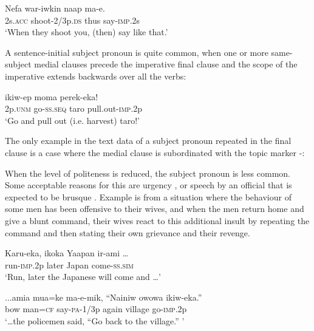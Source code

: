 \ea%
\label{ex:3:x1775}
\gll Nefa war-iwkin naap ma-e. \\
2s.\textsc{acc} shoot-2/3p.\textsc{ds} thus say-\textsc{imp}.2s\\
\glt`When they shoot you, (then) say like that.'
\z

A sentence-initial subject pronoun is quite common, when one or more same-subject medial clauses precede the imperative final clause and the scope of the imperative extends backwards over all the verbs:

\ea%
\label{ex:3:x628}
\gll {} ikiw-ep moma perek-eka! \\
2p.\textsc{unm} go-\textsc{ss}.\textsc{seq} taro pull.out-\textsc{imp}.2p\\
\glt`Go and pull out (i.e. harvest) taro!'
\z

The only example in the text data of a subject pronoun repeated in the final clause is a case where the medial clause is subordinated with the topic marker -: 


When the level of politeness is reduced, the subject pronoun is less common. Some acceptable reasons for this are urgency , or speech by an official that is expected to be brusque . Example  is from a situation where the behaviour of some men has been offensive to their wives, and when the men return home and give a blunt command, their wives react to this additional insult by repeating the command and then stating their own grievance and their revenge. 

\ea%
\label{ex:3:x1777}
\gll Karu-eka, ikoka Yaapan ir-ami {\dots} \\
run-\textsc{imp}.2p later Japan come-\textsc{ss}.\textsc{sim}\\
\glt`Run, later the Japanese will come and {\dots}'
\z

\ea%
\label{ex:3:x1778}
\gll ...amia mua=ke ma-e-mik, ``Nainiw owowa ikiw-eka.'' \\
bow man=\textsc{cf} say-\textsc{pa}-1/3p again village go-\textsc{imp}.2p\\
\glt`{\dots}the policemen said, ``Go back to the village.'' '
\z

